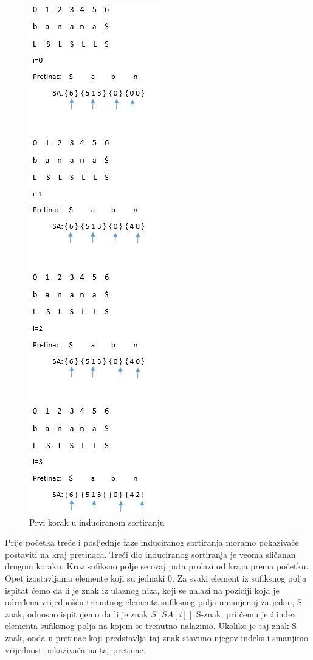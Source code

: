 \begin{figure}[H]
   \centering
       \includegraphics{./pictures/SAISstep2.jpg}
 \caption{Prvi korak u induciranom sortiranju}
 \label{fig:sais2}
\end{figure}

Prije početka treće i posljednje faze induciranog sortiranja moramo pokazivače postaviti na kraj pretinaca. Treći dio induciranog sortiranja je veoma sličanan drugom koraku. Kroz sufiksno polje se ovaj puta prolazi od kraja prema početku. Opet izostavljamo elemente koji su jednaki 0.  Za svaki element iz sufiksnog polja ispitat ćemo da li je znak iz ulaznog niza, koji se nalazi na poziciji koja je određena vrijednošću trenutnog elementa sufiksnog polja umanjenoj za jedan, S-znak, odnosno ispitujemo da li je znak $S[SA[i]]$ S-znak, pri ćemu je $i$ index elementa sufiksnog polja na kojem se trenutno nalazimo. Ukoliko je taj znak S-znak, onda u pretinac koji predstavlja taj znak stavimo njegov indeks i smanjimo vrijednost pokazivača na taj pretinac. 

